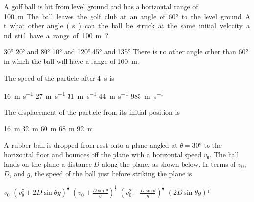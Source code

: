 \documentclass{../../../oss-classkick-exam}
\begin{document}
\begin{multicols*}{2}
\begin{questions}
    \question A golf ball is hit from level ground and has a horizontal range of
    \SI{100}\metre. The ball leaves the golf club at an angle of \ang{60} to
    the level ground. At what other angle(s) can the ball be struck at the same
    initial velocity and still have a range of \SI{100}{\metre}?
    \begin{choices}
      \choice\ang{30}
      \choice\ang{20} and \ang{80}
      \choice\ang{10} and \ang{120}
      \choice\ang{45} and \ang{135}
      \choice There is no other angle other than \ang{60} in which the ball will
      have a range of \SI{100}{\metre}.
    \end{choices}


    \question The speed of the particle after \SI{4}{\second} is
    \begin{choices}
      \choice\SI{16 }{\metre\per\second}
      \choice\SI{27 }{\metre\per\second}
      \choice\SI{31 }{\metre\per\second}
      \choice\SI{44 }{\metre\per\second}
      \choice\SI{985}{\metre\per\second}
    \end{choices}
    \label{q:particle1}
    
    \question The displacement of the particle from its initial position is
    \begin{choices}
      \choice\SI{16}{\metre}
      \choice\SI{32}{\metre}
      \choice\SI{60}{\metre}
      \choice\SI{68}{\metre}
      \choice\SI{92}{\metre}
    \end{choices}
    \label{q:particle2}
    
    \question A rubber ball is dropped from rest onto a plane angled at
    $\theta=\ang{30}$ to the horizontal floor and bounces off the plane with a
    horizontal speed $v_0$. The ball lands on the plane a distance $D$ along the
    plane, as shown below. In terms of $v_0$, $D$, and $g$, the speed of the
    ball just before striking the plane is
    \begin{choices}
      \choice $v_0$
      \choice $\displaystyle\left(v_0^2+2D\sin\theta g\right)^\frac{1}{2}$
      \choice $\displaystyle\left(v_0+\frac{D\sin\theta}{g}\right)^\frac{1}{2}$
      \choice $\displaystyle\left(v_0^2+\frac{D\sin\theta}{g}\right)^\frac{1}{2}$
      \choice $\displaystyle\left(2D\sin\theta g\right)^\frac{1}{2}$
    \end{choices}
    \vspace{.7in}
    \columnbreak
  

\end{questions}
\end{multicols*}
\end{document}
